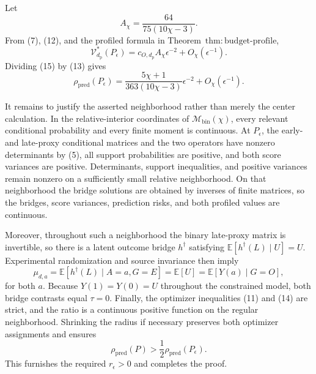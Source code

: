 Let
\[
 A_\chi=\frac{64}{75(10\chi-3)}.
\]
From (7), (12), and the profiled formula in Theorem~\(\mathrm{thm{:}budget\text{-}profile}\),
\[
 \mathcal V_{d_{\mathrm p}}^*(P_\epsilon)
 =c_{O,d_{\mathrm p}}A_\chi\epsilon^{-2}
  +O_\chi(\epsilon^{-1}).                             \tag{15}
\]
Dividing (15) by (13) gives
\[
 \rho_{\mathrm{pred}}(P_\epsilon)
 =\frac{5\chi+1}{363(10\chi-3)}\epsilon^{-2}
  +O_\chi(\epsilon^{-1}).                             \tag{16}
\]

It remains to justify the asserted neighborhood rather than merely the center calculation.  In the relative-interior coordinates of \(\mathcal M_{\mathrm{bin}}(\chi)\), every relevant conditional probability and every finite moment is continuous.  At \(P_\epsilon\), the early- and late-proxy conditional matrices and the two operators have nonzero determinants by (5), all support probabilities are positive, and both score variances are positive.  Determinants, support inequalities, and positive variances remain nonzero on a sufficiently small relative neighborhood.  On that neighborhood the bridge solutions are obtained by inverses of finite matrices, so the bridges, score variances, prediction risks, and both profiled values are continuous.

Moreover, throughout such a neighborhood the binary late-proxy matrix is invertible, so there is a latent outcome bridge \(h^\dagger\) satisfying
\(\mathbb E[h^\dagger(L)\mid U]=U\).  Experimental randomization and source invariance then imply
\[
 \mu_{d,a}=\mathbb E[h^\dagger(L)\mid A=a,G=E]
 =\mathbb E[U]=\mathbb E[Y(a)\mid G=O],
\]
for both \(a\).  Because \(Y(1)=Y(0)=U\) throughout the constrained model, both bridge contrasts equal \(\tau=0\).  Finally, the optimizer inequalities (11) and (14) are strict, and the ratio is a continuous positive function on the regular neighborhood.  Shrinking the radius if necessary preserves both optimizer assignments and ensures
\[
 \rho_{\mathrm{pred}}(P)>\frac12\rho_{\mathrm{pred}}(P_\epsilon).
\]
This furnishes the required \(r_\epsilon>0\) and completes the proof.